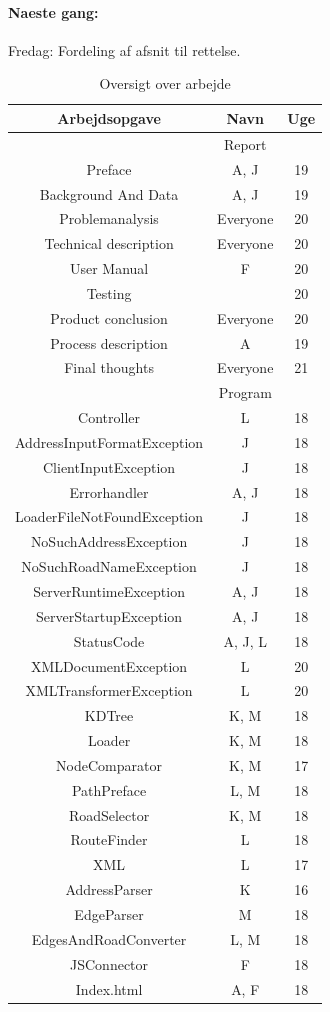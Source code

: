 \documentclass[a4paper,10pt,titlepage]{article}
\begin{document}
		\paragraph{Naeste gang:}
		Fredag: Fordeling af afsnit til rettelse.\\ 

\begin{table}
\caption{Oversigt over arbejde}
\centering
\begin{tabular}{c c c}
Arbejdsopgave & Navn & Uge \\ [1.5ex] 
\hline
   & Report &  \\
Preface & A, J & 19 \\
Background And Data & A, J & 19 \\
Problemanalysis & Everyone & 20\\
Technical description & Everyone & 20 \\
User Manual & F & 20 \\
Testing &  & 20 \\
Product conclusion & Everyone & 20\\
Process description & A & 19\\
Final thoughts & Everyone & 21\\
  & Program &  \\
Controller & L & 18 \\
AddressInputFormatException & J & 18 \\
ClientInputException & J & 18 \\
Errorhandler & A, J & 18 \\
LoaderFileNotFoundException & J & 18 \\
NoSuchAddressException & J & 18 \\
NoSuchRoadNameException & J & 18 \\
ServerRuntimeException & A, J & 18 \\
ServerStartupException & A, J & 18 \\
StatusCode & A, J, L & 18 \\
XMLDocumentException & L & 20 \\
XMLTransformerException & L & 20 \\
KDTree & K, M & 18 \\
Loader & K, M & 18 \\
NodeComparator & K, M & 17 \\
PathPreface & L, M & 18 \\
RoadSelector & K, M & 18 \\
RouteFinder & L & 18 \\
XML	& L & 17 \\
AddressParser & K & 16 \\
EdgeParser & M & 18 \\
EdgesAndRoadConverter & L, M & 18 \\
JSConnector & F & 18 \\
Index.html & A, F & 18 \\




\end{tabular}
\end{table}
\end{document}
